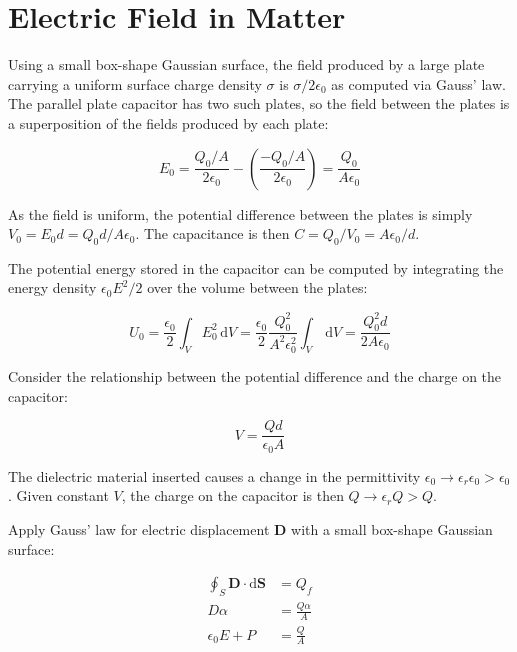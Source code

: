 \documentclass[12pt]{article}
\begin{document}



\pagebreak
\section*{Electric Field in Matter}



Using a small box-shape Gaussian surface, the field produced by a large plate carrying a uniform surface charge density $\sigma$ is $\sigma/2\epsilon_{0}$ as computed via Gauss' law. The parallel plate capacitor has two such plates, so the field between the plates is a superposition of the fields produced by each plate:

\begin{equation}
    E_{0} = \frac{Q_{0}/A}{2\epsilon_{0}} - \left( \frac{-Q_{0}/A}{2\epsilon_{0}} \right) = \frac{Q_{0}}{A\epsilon_{0}}
\end{equation}

As the field is uniform, the potential difference between the plates is simply $V_{0} = E_{0}d = Q_{0}d/A\epsilon_{0}$. The capacitance is then $C = Q_{0}/V_{0} = A\epsilon_{0}/d$.

The potential energy stored in the capacitor can be computed by integrating the energy density $\epsilon_{0}E^{2}/2$ over the volume between the plates:

\begin{equation}
    U_{0} = \frac{\epsilon_{0}}{2} \int_{V} E_{0}^{2} \, \mathrm{d}V = \frac{\epsilon_{0}}{2} \frac{Q_{0}^{2}}{A^{2}\epsilon_{0}^{2}} \int_{V} \, \mathrm{d}V = \frac{Q_{0}^{2}d}{2A\epsilon_{0}}
\end{equation}

Consider the relationship between the potential difference and the charge on the capacitor:

\begin{equation}
    V = \frac{Qd}{\epsilon_{0}A}
\end{equation}

The dielectric material inserted causes a change in the permittivity $\epsilon_{0} \to \epsilon_{r} \epsilon_{0} > \epsilon_{0}$. Given constant $V$, the charge on the capacitor is then $Q \to \epsilon_{r}Q > Q$.

Apply Gauss' law for electric displacement $\mathbf{D}$ with a small box-shape Gaussian surface:

\begin{equation}
\begin{split}
    \oint_{S} \mathbf{D} \cdot \mathrm{d}\mathbf{S} &= Q_{f} \\
    D \alpha &= \frac{Q\alpha}{A} \\
    \epsilon_{0} E + P &= \frac{Q}{A}
\end{split}
\end{equation}
\end{document}

